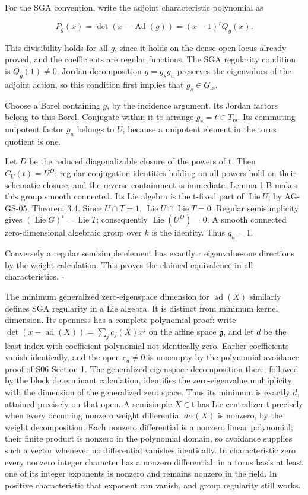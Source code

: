 \documentclass[11pt,a4paper,openany]{report}
\newcounter{none}
\begin{document}
For the SGA convention, write the adjoint characteristic polynomial as

\[
P_g(x)=\det(x-\operatorname{Ad}(g))=(x-1)^rQ_g(x).
\]

This divisibility holds for all \(g\), since it holds on the dense open locus already proved, and the coefficients are regular functions. The SGA regularity condition is \(Q_g(1)\ne0\). Jordan decomposition \(g=g_sg_u\) preserves the eigenvalues of the adjoint action, so this condition first implies that \(g_s\in G_{\mathrm{rs}}\).

Choose a Borel containing \(g\), by the incidence argument. Its Jordan factors belong to this Borel. Conjugate within it to arrange \(g_s=t\in T_{\mathrm{rs}}\). Its commuting unipotent factor \(g_u\) belongs to \(U\), because a unipotent element in the torus quotient is one.

Let \(D\) be the reduced diagonalizable closure of the powers of t. Then \(C_U(t)=U^D\): regular conjugation identities holding on all powers hold on their schematic closure, and the reverse containment is immediate. Lemma 1.B makes this group smooth connected. Its Lie algebra is the t-fixed part of \(\operatorname{Lie}U\), by AG-GS-05, Theorem 3.4. Since \(U\cap T=1\), \(\operatorname{Lie}U\cap\operatorname{Lie}T=0\). Regular semisimplicity gives \((\operatorname{Lie}G)^t=\operatorname{Lie}T\); consequently \(\operatorname{Lie}(U^D)=0\). A smooth connected zero-dimensional algebraic group over \(k\) is the identity. Thus \(g_u=1\).

Conversely a regular semisimple element has exactly r eigenvalue-one directions by the weight calculation. This proves the claimed equivalence in all characteristics. \(\square\)

The minimum generalized zero-eigenspace dimension for \(\operatorname{ad}(X)\) similarly defines SGA regularity in a Lie algebra. It is distinct from minimum kernel dimension. Its openness has a complete polynomial proof: write \(\det(x-\operatorname{ad}(X))=\sum_j c_j(X)x^j\) on the affine space \(\mathfrak g\), and let \(d\) be the least index with coefficient polynomial not identically zero. Earlier coefficients vanish identically, and the open \(c_d\ne0\) is nonempty by the polynomial-avoidance proof of S06 Section 1. The generalized-eigenspace decomposition there, followed by the block determinant calculation, identifies the zero-eigenvalue multiplicity with the dimension of the generalized zero space. Thus its minimum is exactly \(d\), attained precisely on that open. A semisimple \(X\in\mathfrak t\) has Lie centralizer \(\mathfrak t\) precisely when every occurring nonzero weight differential \(d\alpha(X)\) is nonzero, by the weight decomposition. Each nonzero differential is a nonzero linear polynomial; their finite product is nonzero in the polynomial domain, so avoidance supplies such a vector whenever no differential vanishes identically. In characteristic zero every nonzero integer character has a nonzero differential: in a torus basis at least one of its integer exponents is nonzero and remains nonzero in the field. In positive characteristic that exponent can vanish, and group regularity still works.
\end{document}
